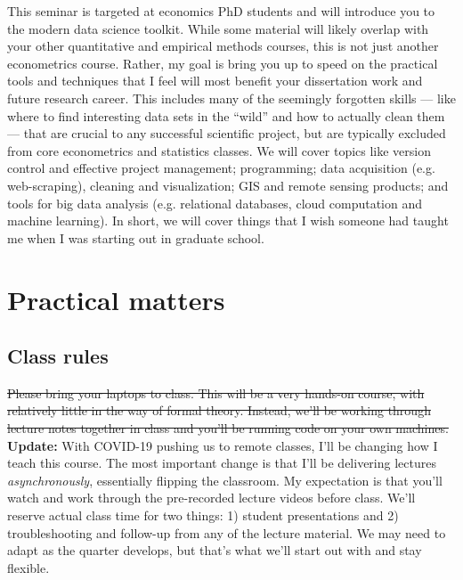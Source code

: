 \documentclass[12]{article}
\begin{document}
This seminar is targeted at economics PhD students and will introduce you to the modern data science toolkit. While some material will likely overlap with your other quantitative and empirical methods courses, this is not just another econometrics course. Rather, my goal is bring you up to speed on the practical tools and techniques that I feel will most benefit your dissertation work and future research career. This includes many of the seemingly forgotten skills --- like where to find interesting data sets in the ``wild'' and how to actually clean them --- that are crucial to any successful scientific project, but are typically excluded from core econometrics and statistics classes. We will cover topics like version control and effective project management; programming; data acquisition (e.g. web-scraping), cleaning and visualization; GIS and remote sensing products; and tools for big data analysis (e.g. relational databases, cloud computation and machine learning). In short, we will cover things that I wish someone had taught me when I was starting out in graduate school. %

\newpage

\section*{Practical matters}

\subsection*{Class rules}

\sout{Please bring your laptops to class. This will be a very hands-on course, with relatively little in the way of formal theory. Instead, we'll be working through lecture notes together in class and you'll be running code on your own machines.} \textbf{Update:} With COVID-19 pushing us to remote classes, I'll be changing how I teach this course. The most important change is that I'll be delivering lectures \textit{asynchronously}, essentially flipping the classroom. My expectation is that you'll watch and work through the pre-recorded lecture videos before class. We'll reserve actual class time for two things: 1) student presentations and 2) troubleshooting and follow-up from any of the lecture material. We may need to adapt as the quarter develops, but that's what we'll start out with and stay flexible.
\end{document}
